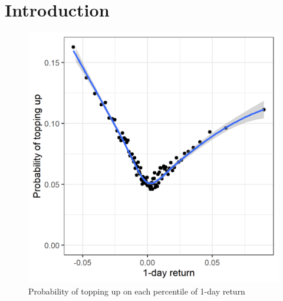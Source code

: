 \documentclass[12pt]{article}
\begin{document}
\maketitle


\section{Introduction}

\begin{figure}[h]
	\includegraphics[scale=0.7]{figure_probtopup_1dayreturn}
	\centering
	\caption{Probability of topping up on each percentile of 1-day return}
\end{figure}
\end{document}
